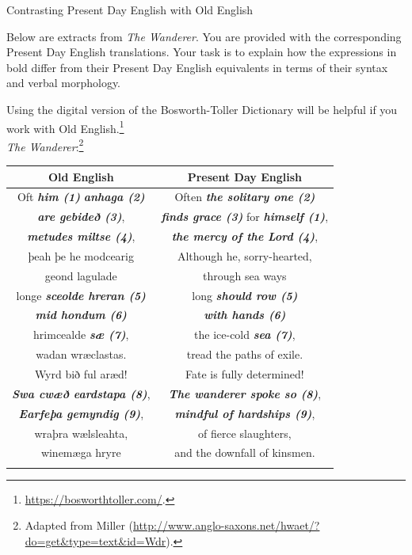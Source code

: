 \begin{exercises}{Contrasting Present Day English with Old English}\label{ex-OE-PDE}

Below are extracts from \textit{The Wanderer}. You are provided with the corresponding Present Day English translations. Your task is to explain how the expressions in bold differ from their Present Day English equivalents in terms of their syntax and verbal morphology.

Using the digital version of the Bosworth-Toller Dictionary will be helpful if you work with Old English.\footnote{\url{https://bosworthtoller.com/}.}\\

\noindent \textit{The Wanderer}:\footnote{Adapted from Miller (\url{http://www.anglo-saxons.net/hwaet/?do=get&type=text&id=Wdr}).}

\begin{center}
\begin{tabular}{ cc }
\lsptoprule
 Old English & Present Day English \\
 \midrule
 Oft \emph{\textbf{him (1)}} \emph{\textbf{anhaga (2)}} & Often \emph{\textbf{the solitary one (2)}}\\ 
 \emph{\textbf{are gebideð (3)}}, &\emph{\textbf{finds grace (3)}} for \emph{\textbf{himself (1)}},\\ 
 \emph{\textbf{metudes miltse (4)}}, &\emph{\textbf{the mercy of the Lord (4)}},\\
 þeah þe he modcearig &Although he, sorry-hearted,\\
 geond lagulade &through sea ways\\
 longe \emph{\textbf{sceolde hreran (5)}} &long \emph{\textbf{should row (5)}}\\
 \emph{\textbf{mid hondum (6)}} &\emph{\textbf{with hands (6)}}\\
 hrimcealde \emph{\textbf{sæ (7)}}, &the ice-cold \emph{\textbf{sea (7)}},\\
 wadan wræclastas. &tread the paths of exile.\\
 Wyrd bið ful aræd! &Fate is fully determined!\\
 \emph{\textbf{Swa cwæð eardstapa (8)}}, &\emph{\textbf{The wanderer spoke so (8)}},\\
 \emph{\textbf{Earfeþa gemyndig (9)}}, &\emph{\textbf{mindful of hardships (9)}},\\
 wraþra wælsleahta, &of fierce slaughters,\\
 winemæga hryre &	and the downfall of kinsmen.\\
 \lspbottomrule
\end{tabular}
\end{center}

\end{exercises}

